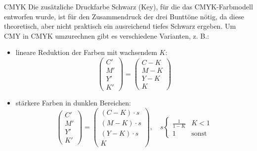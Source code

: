 \begin{defi}[Farbmodell]{CMYK}
    Die zusätzliche Druckfarbe Schwarz (Key), für die das CMYK-Farbmodell entworfen wurde, ist für den Zusammendruck der drei Bunttöne nötig, da diese theoretisch, aber nicht praktisch ein ausreichend tiefes Schwarz ergeben.
    Um CMY in CMYK umzurechnen gibt es verschiedene Varianten, z. B.:
    \begin{itemize}
        \item lineare Reduktion der Farben mit wachsendem $K$:
              \[
                  \begin{pmatrix}
                      C' \\ M' \\ Y' \\ K'
                  \end{pmatrix}
                  =
                  \begin{pmatrix}
                      C - K \\
                      M - K \\
                      Y - K \\
                      K
                  \end{pmatrix}
              \]
        \item stärkere Farben in dunklen Bereichen:
              \[
                  \begin{pmatrix}
                      C' \\ M' \\ Y' \\ K'
                  \end{pmatrix}
                  =
                  \begin{pmatrix}
                      (C - K) \cdot s \\
                      (M - K) \cdot s \\
                      (Y - K) \cdot s \\
                      K
                  \end{pmatrix}
                  , \quad s \begin{cases}
                      \frac{1}{1 - K} & K < 1        \\
                      1               & \text{sonst}
                  \end{cases}
              \]
    \end{itemize}
\end{defi}

